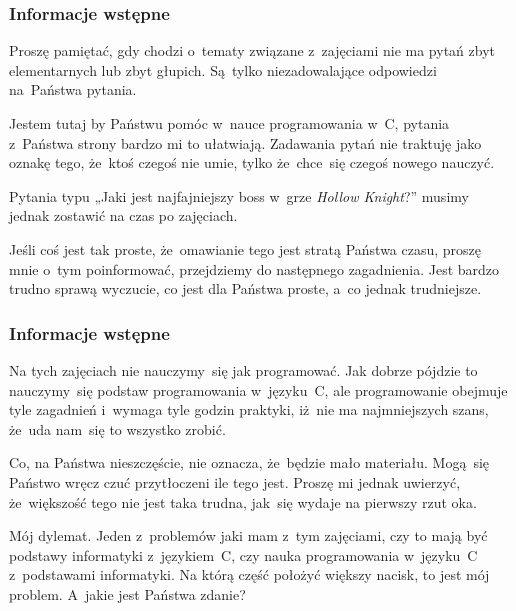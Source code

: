 \documentclass[10pt,t]{beamer}
\begin{document}
\begin{frame}
  \frametitle{Informacje wstępne}


  Proszę pamiętać, gdy chodzi o~tematy związane z~zajęciami
  \alert{nie} ma pytań zbyt elementarnych lub zbyt głupich. Są~tylko
  niezadowalające odpowiedzi na~Państwa pytania.

  Jestem tutaj by Państwu pomóc w~nauce programowania w~C, pytania
  z~Państwa strony bardzo mi to ułatwiają. Zadawania pytań nie traktuję
  jako oznakę tego, że~ktoś czegoś nie umie, tylko że~chce~się czegoś
  nowego nauczyć.

  Pytania typu „Jaki jest najfajniejszy boss w~grze \textit{Hollow
    Knight}?” musimy jednak zostawić na czas po zajęciach.

  Jeśli coś jest tak proste, że~omawianie tego jest stratą Państwa czasu,
  proszę mnie o~tym poinformować, przejdziemy do następnego zagadnienia.
  Jest bardzo trudno sprawą wyczucie, co jest dla Państwa proste, a~co jednak
  trudniejsze.

\end{frame}





\begin{frame}
  \frametitle{Informacje wstępne}


  Na tych zajęciach \alert{nie} nauczymy~się jak programować. Jak dobrze
  pójdzie to nauczymy~się podstaw programowania w~języku~C, ale
  programowanie obejmuje tyle zagadnień i~wymaga tyle godzin praktyki,
  iż~nie ma najmniejszych szans, że~uda nam~się to wszystko zrobić.

  Co, na Państwa nieszczęście, nie oznacza, że~będzie mało materiału.
  Mogą~się Państwo wręcz czuć przytłoczeni ile tego jest. Proszę mi jednak
  uwierzyć, że~większość tego nie jest taka trudna, jak~się wydaje na
  pierwszy rzut oka.

  \alert{Mój dylemat.} Jeden z~problemów jaki mam z~tym zajęciami, czy to
  mają być \alert{podstawy informatyki} z~językiem~C, czy \alert{nauka
    programowania w~języku~C} z~podstawami informatyki. Na którą część
  położyć większy nacisk, to jest mój problem. A~jakie jest Państwa zdanie?

\end{frame}
\end{document}
